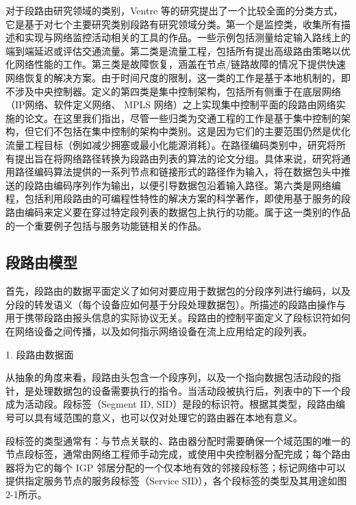 对于段路由研究领域的类别，Ventre \cite{SRSURVEYS} 等的研究提出了一个比较全面的分类方式，它是基于对七个主要研究类别段路有研究领域分类。第一个是监控类，收集所有描述和实现与网络监控活动相关的工具的作品。一些示例包括测量给定输入路线上的端到端延迟或评估交通流量。第二类是流量工程，包括所有提出高级路由策略以优化网络性能的工作。第三类是故障恢复，涵盖在节点/链路故障的情况下提供快速网络恢复的解决方案。由于时间尺度的限制，这一类的工作是基于本地机制的，即不涉及中央控制器。定义的第四类是集中控制架构，包括所有侧重于在底层网络（IP网络、软件定义网络、 \gls*{MPLS} 网络）之上实现集中控制平面的段路由网络实施的论文。在这里我们指出，尽管一些归类为交通工程的工作是基于集中控制的架构，但它们不包括在集中控制的架构中类别。这是因为它们的主要范围仍然是优化流量工程目标（例如减少拥塞或最小化能源消耗）。在路径编码类别中，研究将所有提出旨在将网络路径转换为段路由列表的算法的论文分组。具体来说，研究将通用路径编码算法提供的一系列节点和链接形式的路径作为输入，将在数据包头中推送的段路由编码序列作为输出，以便引导数据包沿着输入路径。第六类是网络编程，包括利用段路由的可编程性特性的解决方案的科学著作，即使用基于服务的段路由编码来定义要在穿过特定段列表的数据包上执行的功能。属于这一类别的作品的一个重要例子包括与服务功能链相关的作品。

\subsection{段路由模型}

首先，段路由的数据平面定义了如何对要应用于数据包的分段序列进行编码，以及分段的转发语义（每个设备应如何基于分段处理数据包）。所描述的段路由操作与用于携带段路由报头信息的实际协议无关。段路由的控制平面定义了段标识符如何在网络设备之间传播，以及如何指示网络设备在流上应用给定的段列表。

1. 段路由数据面

从抽象的角度来看，段路由头包含一个段序列，以及一个指向数据包活动段的指针，是处理数据包的设备需要执行的指令。当活动段被执行后，列表中的下一个段成为活动段。段标签（Segment ID, SID）是段的标识符。根据其类型，段路由编号可以具有域范围的意义，也可以仅对处理它的路由器在本地有意义。

段标签的类型通常有：与节点关联的、路由器分配时需要确保一个域范围的唯一的节点段标签，通常由网络工程师手动完成，或使用中央控制器分配完成；每个路由器将为它的每个 \gls*{IGP} 邻居分配的一个仅本地有效的邻接段标签；标记网络中可以提供指定服务节点的服务段标签（Service SID），各个段标签的类型及其用途如图2-1所示。

